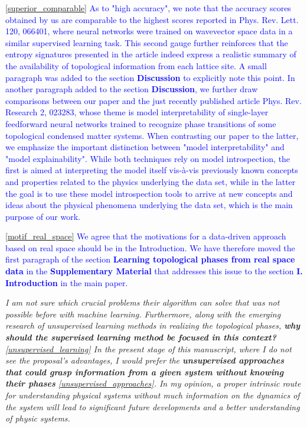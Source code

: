 \documentclass[10pt]{revtex4-1}
\newcounter{quoter}
\newcommand{\genquote}[1]{\refstepcounter{quoter} \label{#1} \ref{#1}}
\newcommand{\citequote}[1]{\ref{#1}}
\begin{document}
\textcolor{blue}{\citequote{superior_comparable} As to "high accuracy", we note that the accuracy scores obtained by us are comparable to the highest scores reported in Phys. Rev. Lett. 120, 066401, where neural networks were trained on wavevector space data in a similar supervised learning task. This second gauge further reinforces that the entropy signatures presented in the article indeed express a realistic summary of the availability of topological information from each lattice site. A small paragraph was added to the section \textbf{Discussion} to explicitly note this point. In another paragraph added to the section \textbf{Discussion}, we further draw comparisons between our paper and the just recently published article Phys. Rev. Research 2, 023283,  whose theme is model interpretability of single-layer feedforward neural networks trained to recognize phase transitions of some topological condensed matter systems. When contrasting our paper to the latter, we emphasize the important distinction between "model interpretability" and "model explainability". While both techniques rely on model introspection, the first is aimed at interpreting the model itself vis-à-vis previously known concepts and properties related to the physics underlying the data set, while in the latter the goal is to use these model introspection tools to arrive at new concepts and ideas about the physical phenomena underlying the data set, which is the main purpose of our work.}   

\textcolor{blue}{\citequote{motif_real_space} We agree that the motivations for a data-driven approach based on real space should be in the Introduction.  We have therefore moved the first paragraph of the section \textbf{Learning topological phases from real space data} in the \textbf{Supplementary Material} that addresses this issue to the section \textbf{I. Introduction} in the main paper.}  

\vspace{0.5cm}
\emph{I am not sure which crucial problems their algorithm can solve that was not possible before with machine learning. Furthermore, along with the emerging research of unsupervised learning methods in realizing the topological phases, \textbf{why should the supervised learning method be focused in this context?}\genquote{unsupervised_learning} In the present stage of this manuscript, where I do not see the proposal's advantages, I would prefer the \textbf{unsupervised approaches that could grasp information from a given system without knowing their phases}\genquote{unsupervised_approaches}. In my opinion, a proper intrinsic route for understanding physical systems without much information on
the dynamics of the system will lead to significant future developments and a better understanding of physic systems.}
\end{document}
